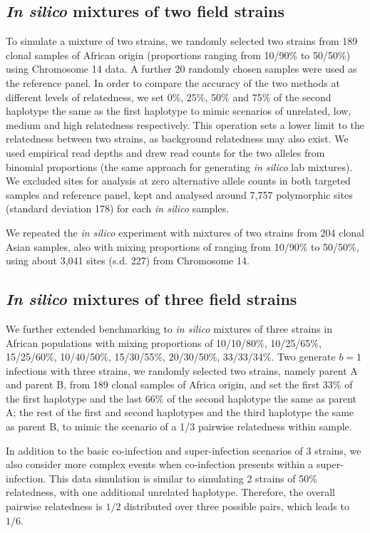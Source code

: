 \documentclass[9pt]{article}
\begin{document}
\subsection{{\it In silico} mixtures of two field strains}
To simulate a mixture of two strains, we randomly selected two strains from 189 clonal samples of African origin (proportions ranging from 10/90\% to 50/50\%) using Chromosome 14 data.  A further 20 randomly chosen samples were used as the reference panel. In order to compare the accuracy of the two methods at different levels of relatedness, we set 0\%, 25\%, 50\% and 75\% of the second haplotype the same as the first haplotype to mimic scenarios of unrelated, low, medium and high relatedness respectively. This operation sets a lower limit to the relatedness between two strains, as background relatedness may also exist. We used empirical read depths and drew read counts for the two alleles from binomial proportions (the same approach for generating {\it in silico} lab mixtures). We excluded sites for analysis at zero alternative allele counts in both targeted samples and reference panel, kept and analysed around 7,757 polymorphic sites (standard deviation 178) for each {\it in silico} samples.

We repeated the \emph{in silico} experiment with mixtures of two strains from 204 clonal Asian samples, also with mixing proportions of ranging from 10/90\% to 50/50\%, using about 3,041 sites (s.d. 227) from Chromosome 14.

\subsection{{\it In silico} mixtures of three field strains}
We further extended benchmarking to \emph{in silico} mixtures of three strains in African populations with mixing proportions of 10/10/80\%, 10/25/65\%, 15/25/60\%, 10/40/50\%, 15/30/55\%, 20/30/50\%, 33/33/34\%. Two generate $b=1$ infections with three strains, we randomly selected two strains, namely parent A and parent B, from 189 clonal samples of Africa origin, and set the first 33\% of the first haplotype and the last 66\% of the second haplotype the same as parent A; the rest of the first and second haplotypes and the third haplotype the same as parent B, to mimic the scenario of a 1/3 pairwise relatedness within sample.

In addition to the basic co-infection and super-infection scenarios of 3 strains, we also consider more complex events when co-infection presents within a super-infection. This data simulation is similar to simulating 2 strains of 50\% relatedness, with one additional unrelated haplotype. Therefore, the overall pairwise relatedness is $1/2$ distributed over three possible pairs, which leads to $1/6$.
\end{document}
